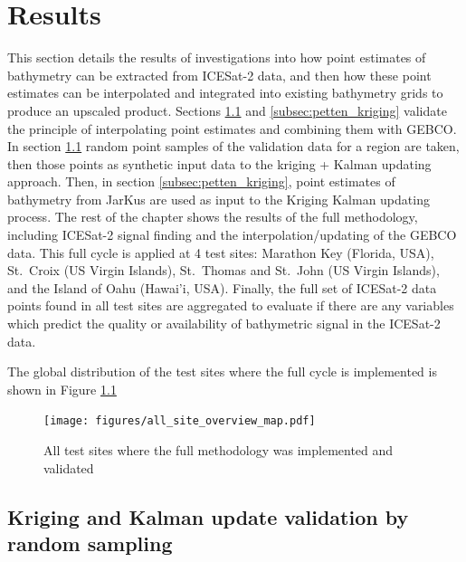 
\chapter{Results}

This section details the results of investigations into how point estimates of bathymetry can be extracted from ICESat-2 data, and then how these point estimates can be interpolated and integrated into existing bathymetry grids to produce an upscaled product. Sections \ref{subsec:randomsample} and \ref{subsec:petten_kriging} validate the principle of interpolating point estimates and combining them with GEBCO. In section \ref{subsec:randomsample} random point samples of the validation data for a region are taken, then those points as synthetic input data to the kriging + Kalman updating approach. Then, in section \ref{subsec:petten_kriging}, point estimates of bathymetry from JarKus are used as input to the Kriging Kalman updating process. The rest of the chapter shows the results of the full methodology, including ICESat-2 signal finding and the interpolation/updating of the GEBCO data. This full cycle is applied at 4 test sites: Marathon Key (Florida, USA), St.~Croix (US Virgin Islands), St.~Thomas and St.~John (US Virgin Islands), and the Island of Oahu (Hawai'i, USA). Finally, the full set of ICESat-2 data points found in all test sites are aggregated to evaluate if there are any variables which predict the quality or availability of bathymetric signal in the ICESat-2 data.

The global distribution of the test sites where the full cycle is implemented is shown in Figure \ref{fig:world-site-map}

\begin{figure}[!ht]
    \centering
    \texttt{[image: figures/all\_site\_overview\_map.pdf]}
    \caption{All test sites where the full methodology was implemented and validated}
    \label{fig:world-site-map}
\end{figure}

\section{Kriging and Kalman update validation by random sampling}\label{subsec:randomsample}

